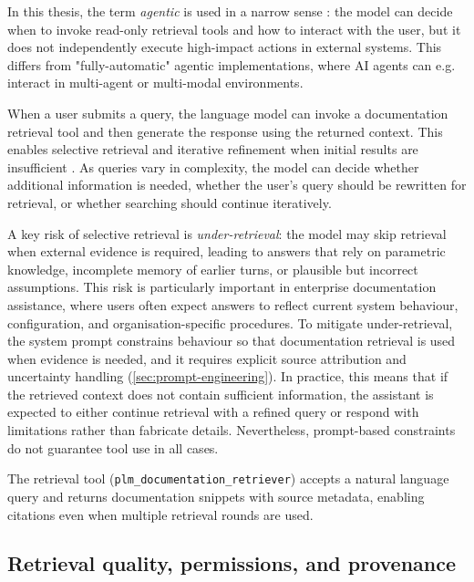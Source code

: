 In this thesis, the term \emph{agentic} is used in a narrow sense \parencite{plaatAgenticLargeLanguage2026}: the model can decide when to invoke read-only retrieval tools and how to interact with the user, but it does not independently execute high-impact actions in external systems. This differs from "fully-automatic" agentic implementations, where AI agents can e.g. interact in multi-agent or multi-modal environments.

When a user submits a query, the language model can invoke a documentation retrieval tool and then generate the response using the returned context. This enables selective retrieval and iterative refinement when initial results are insufficient \parencite{fengRetrievalGenerationSynergyAugmented2024}. As queries vary in complexity, the model can decide whether additional information is needed, whether the user's query should be rewritten for retrieval, or whether searching should continue iteratively.

A key risk of selective retrieval is \emph{under-retrieval}: the model may skip retrieval when external evidence is required, leading to answers that rely on parametric knowledge, incomplete memory of earlier turns, or plausible but incorrect assumptions. This risk is particularly important in enterprise documentation assistance, where users often expect answers to reflect current system behaviour, configuration, and organisation-specific procedures. To mitigate under-retrieval, the system prompt constrains behaviour so that documentation retrieval is used when evidence is needed, and it requires explicit source attribution and uncertainty handling (\autoref{sec:prompt-engineering}). In practice, this means that if the retrieved context does not contain sufficient information, the assistant is expected to either continue retrieval with a refined query or respond with limitations rather than fabricate details. Nevertheless, prompt-based constraints do not guarantee tool use in all cases.

The retrieval tool (\texttt{plm\_documentation\_retriever}) accepts a natural language query and returns documentation snippets with source metadata, enabling citations even when multiple retrieval rounds are used.

\subsection{Retrieval quality, permissions, and provenance}
\label{subsec:hybrid-retrieval}

